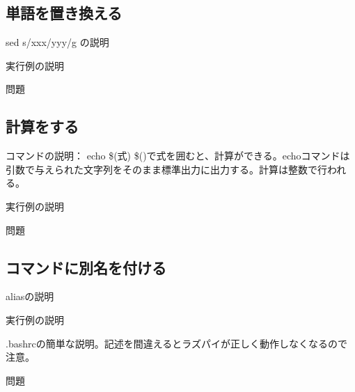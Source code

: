 \subsection{単語を置き換える}

sed s/xxx/yyy/g の説明

実行例の説明

問題

\subsection{計算をする}

コマンドの説明： echo \$(式)
\$()で式を囲むと、計算ができる。echoコマンドは引数で与えられた文字列をそのまま標準出力に出力する。計算は整数で行われる。


実行例の説明

問題

\subsection{コマンドに別名を付ける}

aliasの説明

実行例の説明

.bashrcの簡単な説明。記述を間違えるとラズパイが正しく動作しなくなるので注意。

問題
